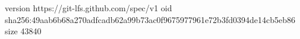 version https://git-lfs.github.com/spec/v1
oid sha256:49aab6b68a270adfcadb62a99b73ac0f9675977961e72b3fd0394de14cb5eb86
size 43840
